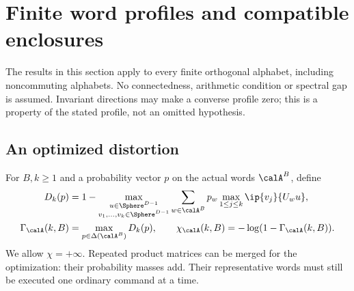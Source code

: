 \section{Finite word profiles and compatible enclosures}\label{sec:profiles}
The results in this section apply to every finite orthogonal alphabet, including noncommuting alphabets. No connectedness, arithmetic condition or spectral gap is assumed. Invariant directions may make a converse profile zero; this is a property of the stated profile, not an omitted hypothesis.

\subsection{An optimized distortion}
For $B,k\ge1$ and a probability vector $p$ on the actual words $\calA^B$, define
\begin{align}
 D_k(p)&=1-\max_{\substack{u\in\Sphere^{D-1}\\v_1,\ldots,v_k\in\Sphere^{D-1}}}
       \sum_{w\in\calA^B}p_w\max_{1\le j\le k}\ip{v_j}{U_wu},\label{eq:distortion43}\\
 \Gamma_{\calA}(k,B)&=\max_{p\in\Delta(\calA^B)}D_k(p),
 \qquad \chi_{\calA}(k,B)=-\log(1-\Gamma_{\calA}(k,B)).\label{eq:gamma43}
\end{align}
We allow $\chi=+\infty$. Repeated product matrices can be merged for the optimization: their probability masses add. Their representative words must still be executed one ordinary command at a time.

